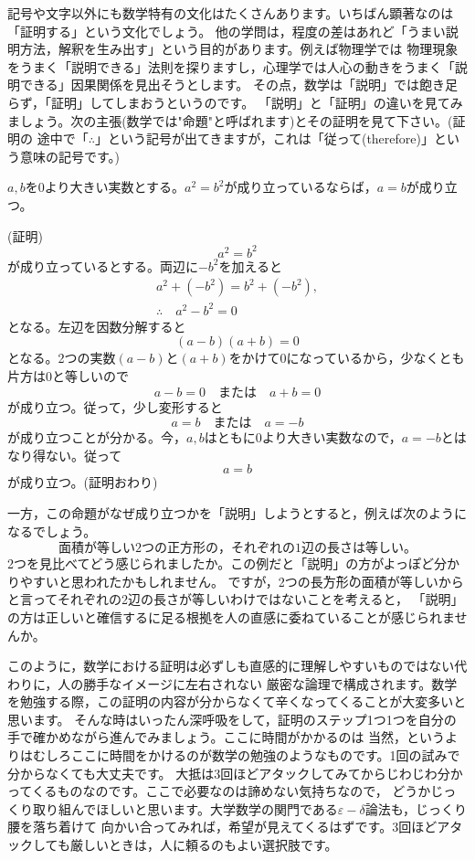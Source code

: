 \documentclass[./main]{subfiles}
\begin{document}
記号や文字以外にも数学特有の文化はたくさんあります。いちばん顕著なのは「証明する」という文化でしょう。
他の学問は，程度の差はあれど「うまい説明方法，解釈を生み出す」という目的があります。例えば物理学では
物理現象をうまく「説明できる」法則を探りますし，心理学では人心の動きをうまく「説明できる」因果関係を見出そうとします。
その点，数学は「説明」では飽き足らず，「証明」してしまおうというのです。
「説明」と「証明」の違いを見てみましょう。次の主張(数学では"命題"と呼ばれます)とその証明を見て下さい。(証明の
途中で「$\therefore$」という記号が出てきますが，これは「従って(therefore)」という意味の記号です。)

\begin{thm}
$a,b$を0より大きい実数とする。$a^2 = b^2$が成り立っているならば，$a = b$が成り立つ。
\end{thm}
(証明)
\[a^2 = b^2 \]
が成り立っているとする。両辺に$-b^2$を加えると
\begin{gather*}
a^2 + (-b^2) = b^2 + (-b^2), \\
\therefore \quad a^2 - b^2 = 0
\end{gather*}
となる。左辺を因数分解すると
\[
(a-b)(a+b) = 0
\]
となる。2つの実数$(a-b)と(a+b)$をかけて0になっているから，少なくとも片方は0と等しいので
\[
a-b=0 \quad または\quad a+b=0
\]
が成り立つ。従って，少し変形すると
\[
a=b \quad または \quad a=-b
\]
が成り立つことが分かる。今，$a,b$はともに0より大きい実数なので，$a=-b$とはなり得ない。従って
\[
a=b
\]
が成り立つ。(証明おわり)

一方，この命題がなぜ成り立つかを「説明」しようとすると，例えば次のようになるでしょう。
\[
面積が等しい2つの正方形の，それぞれの1辺の長さは等しい。
\]
2つを見比べてどう感じられましたか。この例だと「説明」の方がよっぽど分かりやすいと思われたかもしれません。
ですが，2つの\.{長}\.{方}\.{形}の面積が等しいからと言ってそれぞれの2辺の長さが等しいわけではないことを考えると，
「説明」の方は正しいと確信するに足る根拠を人の直感に委ねていることが感じられませんか。

このように，数学における証明は必ずしも直感的に理解しやすいものではない代わりに，人の勝手なイメージに左右されない
厳密な論理で構成されます。数学を勉強する際，この証明の内容が分からなくて辛くなってくることが大変多いと思います。
そんな時はいったん深呼吸をして，証明のステップ1つ1つを自分の手で確かめながら進んでみましょう。ここに時間がかかるのは
当然，というよりはむしろここに時間をかけるのが数学の勉強のようなものです。1回の試みで分からなくても大丈夫です。
大抵は3回ほどアタックしてみてからじわじわ分かってくるものなのです。ここで必要なのは諦めない気持ちなので，
どうかじっくり取り組んでほしいと思います。大学数学の関門である$\varepsilon-\delta$論法も，じっくり腰を落ち着けて
向かい合ってみれば，希望が見えてくるはずです。3回ほどアタックしても厳しいときは，人に頼るのもよい選択肢です。
\end{document}
